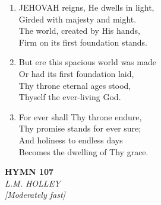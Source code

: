 \begin{enumerate}
    \item JEHOVAH reigns, He dwells in light, \\
        Girded with majesty and might. \\
        The world, created by His hands, \\
        Firm on its first foundation stands.

    \item But ere this spacious world was made \\
        Or had its first foundation laid, \\
        Thy throne eternal ages stood, \\
        Thyself the ever-living God.

    \item For ever shall Thy throne endure, \\
        Thy promise stands for ever sure; \\
        And holiness to endless days \\
        Becomes the dwelling of Thy grace.

\end{enumerate}

\newpage
\begin{center}
    {\Large \textbf{HYMN 107}}
    \\
    \textit{L.M. HOLLEY}
    \\
    \textit{\small [Moderately fast]}
\end{center}
\vspace{1em}

